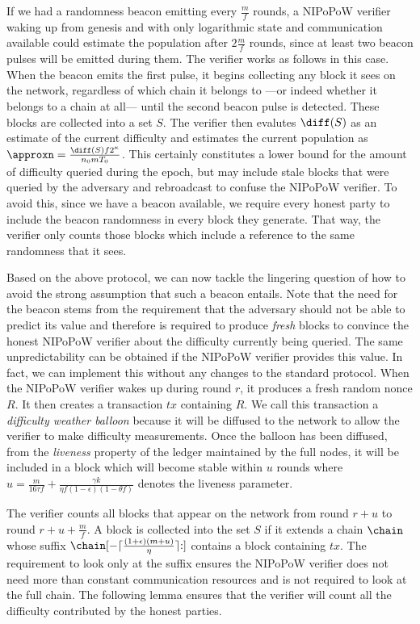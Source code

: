 If we had a randomness beacon emitting every $\frac{m}{f}$ rounds, a NIPoPoW
verifier waking up from genesis and with only logarithmic state and
communication available could estimate the population after $2\frac{m}{f}$
rounds, since at least two beacon pulses will be emitted during them. The
verifier works as follows in this case. When the beacon emits the first pulse,
it begins collecting any block it sees on the network, regardless of which
chain it belongs to ---or indeed whether it belongs to a chain at all--- until
the second beacon pulse is detected. These blocks are collected into a set $S$.
The verifier then evalutes $\diff(S)$ as an estimate of the current difficulty
and estimates the current population as
$\approxn = \frac{\diff(S)f 2^\kappa}{n_0 m T_0}$. This certainly constitutes a
lower bound for the amount of difficulty queried during the epoch, but may
include stale blocks that were queried by the adversary and rebroadcast to
confuse the NIPoPoW verifier. To avoid this, since we have a beacon available,
we require every honest party to include the beacon randomness in every block
they generate. That way, the verifier only counts those blocks which include a
reference to the same randomness that it sees.

Based on the above protocol, we can now tackle the lingering question of how to
avoid the strong assumption that such a beacon entails. Note that the need for
the beacon stems from the requirement that the adversary should not be able to
predict its value and therefore is required to produce \emph{fresh} blocks to
convince the honest NIPoPoW verifier about the difficulty currently being
queried. The same unpredictability can be obtained if the NIPoPoW verifier
provides this value. In fact, we can implement this without any changes to the
standard protocol. When the NIPoPoW verifier wakes up during round $r$, it
produces a fresh random nonce $R$. It then creates a transaction $tx$ containing
$R$. We call this transaction a \emph{difficulty weather balloon} because it
will be diffused to the network to allow the verifier to make difficulty
measurements. Once the balloon has been diffused, from the
\emph{liveness} property of the ledger maintained by the full nodes, it will be
included in a block which will become stable within $u$ rounds where $u =
\frac{m}{16\tau f} + \frac{\gamma k}{\eta f (1 - \epsilon) (1 - \theta f)}$
denotes the liveness parameter.

The verifier counts all blocks that appear on the network from round $r + u$ to
round $r + u + \frac{m}{f}$. A block is collected into the set $S$ if it extends
a chain $\chain$ whose suffix
$\chain[-\lceil\frac{(1 + \epsilon)(m + u)}{\eta}\rceil{:}]$
contains a block containing $tx$. The requirement to look
only at the suffix ensures the NIPoPoW verifier does not need more than constant
communication resources and is not required to look at the full chain. The
following lemma ensures that the verifier will count all the difficulty
contributed by the honest parties.

